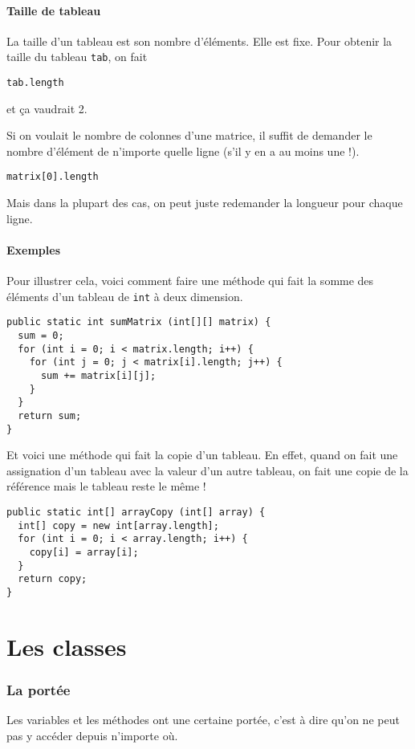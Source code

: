 \subsection{Taille de tableau}
La taille d'un tableau est son nombre d'éléments.
Elle est fixe.
Pour obtenir la taille du tableau \lstinline|tab|, on fait
\begin{lstlisting}
tab.length
\end{lstlisting}
et ça vaudrait 2.

Si on voulait le nombre de colonnes d'une matrice, il suffit de demander
le nombre d'élément de n'importe quelle ligne (s'il y en a au moins une !).
\begin{lstlisting}
matrix[0].length
\end{lstlisting}
Mais dans la plupart des cas,
on peut juste redemander la longueur pour chaque ligne.

\subsection{Exemples}
Pour illustrer cela, voici comment faire une méthode qui fait la somme des
éléments d'un tableau de \lstinline|int| à deux dimension.
\begin{lstlisting}
public static int sumMatrix (int[][] matrix) {
  sum = 0;
  for (int i = 0; i < matrix.length; i++) {
    for (int j = 0; j < matrix[i].length; j++) {
      sum += matrix[i][j];
    }
  }
  return sum;
}
\end{lstlisting}

Et voici une méthode qui fait la copie d'un tableau.
En effet, quand on fait une assignation d'un tableau avec la valeur d'un autre
tableau, on fait une copie de la référence mais le tableau reste le même !
\begin{lstlisting}
public static int[] arrayCopy (int[] array) {
  int[] copy = new int[array.length];
  for (int i = 0; i < array.length; i++) {
    copy[i] = array[i];
  }
  return copy;
}
\end{lstlisting}

\part{Les classes}
\section{La portée}
Les variables et les méthodes ont une certaine portée, c'est à dire
qu'on ne peut pas y accéder depuis n'importe où.

